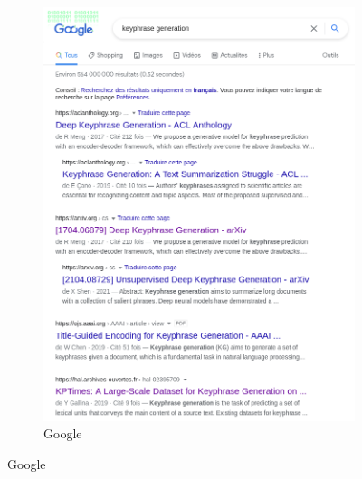 \begin{figure}[!htbp]
    \centering
    \begin{subfigure}{.8\textwidth}
        \centering
        \includegraphics[scale=0.30]{1_introduction/figures/google.png}
        \caption{Google}
        \label{fig:res_google}
    \end{subfigure}
    

\end{figure}

